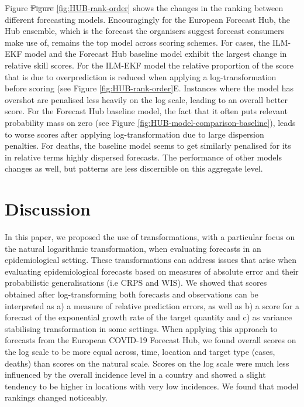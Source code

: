 \documentclass{article}
\providecommand{\DIFdeltex}[1]{{\protect\color{red}\sout{#1}}}                      %
\providecommand{\DIFdelbegin}{} %
\providecommand{\DIFdelend}{} %
\providecommand{\DIFdel}[1]{\texorpdfstring{\DIFdeltex{#1}}{}} %
\newcommand{\DIFscaledelfig}{0.5}
\newlength{\DIFdelgraphicswidth} %
\newlength{\DIFdelgraphicsheight} %
\newcommand{\DIFdelincludegraphics}[2][]{%
\sbox{\DIFdelgraphicsbox}{\DIFOincludegraphics[#1]{#2}}%
\settoboxwidth{\DIFdelgraphicswidth}{\DIFdelgraphicsbox} %
\settoboxtotalheight{\DIFdelgraphicsheight}{\DIFdelgraphicsbox} %
\scalebox{\DIFscaledelfig}{%
\parbox[b]{\DIFdelgraphicswidth}{\usebox{\DIFdelgraphicsbox}\\[-\baselineskip] \rule{\DIFdelgraphicswidth}{0em}}\llap{\resizebox{\DIFdelgraphicswidth}{\DIFdelgraphicsheight}{%
\setlength{\unitlength}{\DIFdelgraphicswidth}%
\begin{picture}(1,1)%
\thicklines\linethickness{2pt} %
{\color[rgb]{1,0,0}\put(0,0){\framebox(1,1){}}}%
{\color[rgb]{1,0,0}\put(0,0){\line( 1,1){1}}}%
{\color[rgb]{1,0,0}\put(0,1){\line(1,-1){1}}}%
\end{picture}%
}\hspace*{3pt}}} %
} %
\DeclareRobustCommand{\DIFdelbegin}{\DIFOdelbegin \let\includegraphics\DIFdelincludegraphics} %
\DeclareRobustCommand{\DIFdelend}{\DIFOaddend \let\includegraphics\DIFOincludegraphics} %
\begin{document}
Figure \DIFdelbegin \DIFdel{Figure }\DIFdelend \ref{fig:HUB-rank-order} shows the changes in the ranking between different forecasting models. Encouragingly for the European Forecast Hub, the Hub ensemble, which is the forecast the organisers suggest forecast consumers make use of, remains the top model across scoring schemes. For cases, the ILM-EKF model and the Forecast Hub baseline model exhibit the largest change in relative skill scores. For the ILM-EKF model the relative proportion of the score that is due to overprediction is reduced when applying a log-transformation before scoring (see Figure \ref{fig:HUB-rank-order}E. Instances where the model has overshot are penalised less heavily on the log scale, leading to an overall better score. For the Forecast Hub baseline model, the fact that it often puts relevant probability mass on zero (see Figure \ref{fig:HUB-model-comparison-baseline}), leads to worse scores after applying log-transformation due to large dispersion penalties. For deaths, the baseline model seems to get similarly penalised for its in relative terms highly dispersed forecasts. The performance of other models changes as well, but patterns are less discernible on this aggregate level. 

\section{Discussion}
\label{sec:discussion}

In this paper, we proposed the use of transformations, with a particular focus on the natural logarithmic transformation, when evaluating forecasts in an epidemiological setting. These transformations can address issues that arise when evaluating epidemiological forecasts based on measures of absolute error and their probabilistic generalisations (i.e CRPS and WIS). We showed that scores obtained after log-transforming both forecasts and observations can be interpreted as a) a measure of relative prediction errors, as well as b) a score for a forecast of the exponential growth rate of the target quantity and c) as variance stabilising transformation in some settings.
When applying this approach to forecasts from the European COVID-19 Forecast Hub, we found overall scores on the log scale to be more equal across, time, location and target type (cases, deaths) than scores on the natural scale. Scores on the log scale were much less influenced by the overall incidence level in a country and showed a slight tendency to be higher in locations with very low incidences. We found that model rankings changed noticeably. 
\end{document}
